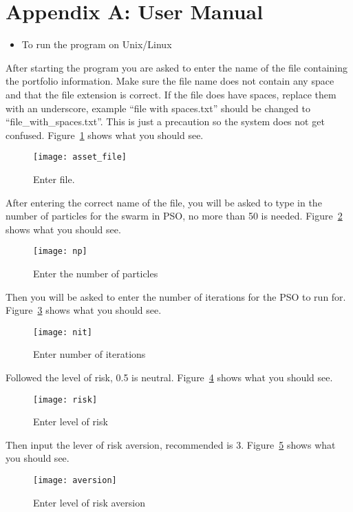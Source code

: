 \chapter*{Appendix A: User Manual}

\begin{itemize}
  \item To run the program on Unix/Linux
\end{itemize}

After starting the program you are asked to enter the name of the file containing the portfolio information. Make sure the file name does not contain any space and that the file extension is correct. If the file does have spaces, replace them with an underscore, example ``file with spaces.txt'' should be changed to ``file\_with\_spaces.txt''. This is just a precaution so the system does not get confused. Figure~\ref{fig:asset_file} shows what you should see. 
\begin{figure}[H]
  \centering
    \texttt{[image: asset\_file]}
  \caption{Enter file.}
  \label{fig:asset_file}
\end{figure}
After entering the correct name of the file, you will be asked to type in the number of particles for the swarm in PSO, no more than 50 is needed. Figure~\ref{fig:np} shows what you should see. 
\begin{figure}[H]
  \centering
    \texttt{[image: np]}
  \caption{Enter the number of particles}
  \label{fig:np}
\end{figure}
Then you will be asked to enter the number of iterations for the PSO to run for. Figure~\ref{fig:nit} shows what you should see. 
\begin{figure}[H]
  \centering
    \texttt{[image: nit]}
  \caption{Enter number of iterations}
  \label{fig:nit}
\end{figure}
Followed the level of risk, 0.5 is neutral. Figure~\ref{fig:risk} shows what you should see. 
\begin{figure}[H]
  \centering
    \texttt{[image: risk]}
  \caption{Enter level of risk}
  \label{fig:risk}
\end{figure}
Then input the lever of risk aversion, recommended is 3. Figure~\ref{fig:aversion} shows what you should see. 
\begin{figure}[H]
  \centering
    \texttt{[image: aversion]}
  \caption{Enter level of risk aversion}
  \label{fig:aversion}
\end{figure}
